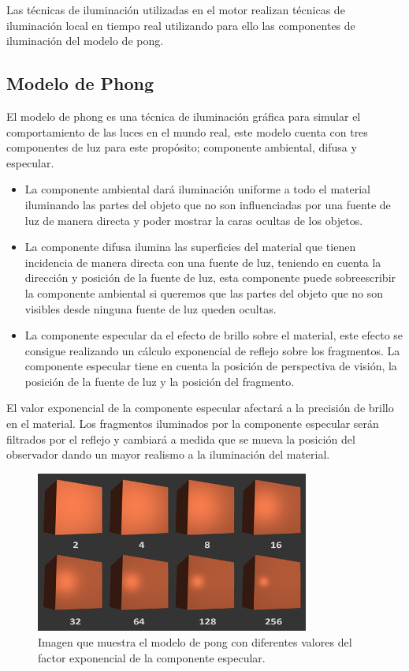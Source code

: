 \documentclass[a4paper]{book}
\begin{document}
Las técnicas de iluminación utilizadas en el motor realizan técnicas de iluminación local en tiempo real utilizando para ello las
componentes de iluminación del modelo de pong.

\subsection{Modelo de Phong}
\label{sec:Modelo de Phong}

El modelo de phong es una técnica de iluminación gráfica para simular el comportamiento de las luces en el mundo real, este modelo
cuenta con tres componentes de luz para este propósito; componente ambiental, difusa y especular.

\begin{itemize}

\item La componente ambiental dará iluminación uniforme a todo el material iluminando las partes del objeto que no son influenciadas por
una fuente de luz de manera directa y poder mostrar la caras ocultas de los objetos.

\item La componente difusa ilumina las superficies del material que tienen incidencia de manera directa con una fuente de luz, teniendo en
cuenta la dirección y posición de la fuente de luz, esta componente puede sobreescribir la componente ambiental si queremos que las
partes del objeto que no son visibles desde ninguna fuente de luz queden ocultas.

\item La componente especular da el efecto de brillo sobre el material, este efecto se consigue realizando un cálculo exponencial de reflejo
sobre los fragmentos. La componente especular tiene en cuenta la posición de perspectiva de visión, la posición de la fuente de luz
y la posición del fragmento.

\end{itemize}

El valor exponencial de la componente especular afectará a la precisión de brillo en el material. Los fragmentos iluminados por la
componente especular serán filtrados por el reflejo y cambiará a medida que se mueva la posición del observador dando un mayor realismo
a la iluminación del material. \cite{illumination:_developer_survey}

\begin{figure}[H]
    \centering
    \includegraphics[width=9cm, keepaspectratio]{img/basic_lighting_specular_shininess.png}
    \caption{Imagen que muestra el modelo de pong con diferentes valores del factor exponencial de la componente especular.}
    \label{basic_lighting_specular_shininess}
\end{figure}
\end{document}
